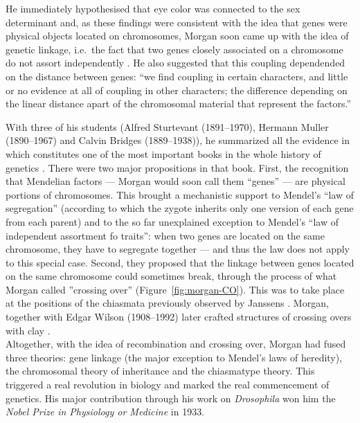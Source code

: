 He immediately hypothesised that eye color was connected to the sex determinant \citep{morgan1910sex} and, as these findings were consistent with the idea that genes were physical objects located on chromosomes, Morgan soon came up with the idea of genetic linkage, i.e.\ the fact that two genes closely associated on a chromosome do not assort independently \citep{morgan1911random}. 
He also suggested that this coupling dependended on the distance between genes: “we find coupling in certain characters, and little or no evidence at all of coupling in other characters; the difference depending on the linear distance apart of the chromosomal material that represent the factors.”

With three of his students (Alfred Sturtevant (1891--1970), Hermann Muller (1890--1967) and Calvin Bridges (1889--1938)), he summarized all the evidence in  which constitutes one of the most important books in the whole history of genetics \citep{gayon2016mendel}. 
There were two major propositions in that book. 
First, the recognition that Mendelian factors — Morgan would soon call them “genes” — are physical portions of chromosomes. This brought a mechanistic support to Mendel's “law of segregation” (according to which the zygote inherits only one version of each gene from each parent) and to the so far unexplained exception to Mendel's “law of independent assortment fo traits”: when two genes are located on the same chromosome, they have to segregate together — and thus the law does not apply to this special case. 
Second, they proposed that the linkage between genes located on the same chromosome could sometimes break, through the process of what Morgan called ”crossing over” (Figure~\ref{fig:morgan-CO}). This was to take place at the positions of the chiasmata previously observed by Janssens \citep{janssens1909theorie}. Morgan, together with Edgar Wilson (1908--1992) later crafted structures of crossing overs with clay \citep{wilson1920chiasmatype}.\\

Altogether, with the idea of recombination and crossing over, Morgan had fused three theories: gene linkage (the major exception to Mendel's laws of heredity), the chromosomal theory of inheritance and the chiasmatype theory. This triggered a real revolution in biology and marked the real commencement of genetics. His major contribution through his work on \textit{Drosophila} won him the \textit{Nobel Prize in Physiology or Medicine} in 1933.

